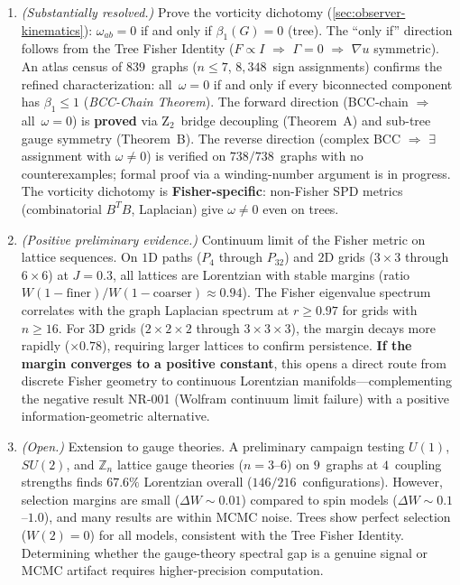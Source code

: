 \documentclass[11pt]{article}
\theoremstyle{definition}
\theoremstyle{remark}
\begin{document}
\begin{enumerate}
  \item \emph{(Substantially resolved.)} Prove the vorticity dichotomy
    (\cref{sec:observer-kinematics}): $\omega_{ab} = 0$ if and only
    if $\beta_1(G) = 0$ (tree). The ``only if'' direction follows from
    the Tree Fisher Identity ($F \propto I$ $\Rightarrow$ $\Gamma = 0$
    $\Rightarrow$ $\nabla u$ symmetric). An atlas census of $839$~graphs
    ($n \leq 7$, $8{,}348$~sign assignments) confirms the refined
    characterization: all~$\omega = 0$ if and only if every biconnected
    component has $\beta_1 \leq 1$ (\emph{BCC-Chain Theorem}).
    The forward direction (BCC-chain $\Rightarrow$ all~$\omega = 0$)
    is \textbf{proved} via Z$_2$~bridge decoupling
    (Theorem~A) and sub-tree gauge symmetry (Theorem~B).
    The reverse direction (complex BCC $\Rightarrow$ $\exists$
    assignment with $\omega \neq 0$) is verified on $738/738$~graphs
    with no counterexamples; formal proof via a winding-number argument
    is in progress. The vorticity dichotomy is
    \textbf{Fisher-specific}: non-Fisher SPD metrics (combinatorial $B^T B$,
    Laplacian) give $\omega \neq 0$ even on trees.

  \item \emph{(Positive preliminary evidence.)}
    Continuum limit of the Fisher metric on lattice sequences.
    On $1$D paths ($P_4$ through $P_{32}$) and $2$D grids ($3{\times}3$
    through $6{\times}6$) at $J = 0.3$, all lattices are Lorentzian
    with stable margins (ratio $W(1{-}\text{finer})/W(1{-}\text{coarser})
    \approx 0.94$). The Fisher eigenvalue spectrum correlates with the
    graph Laplacian spectrum at $r \geq 0.97$ for grids with $n \geq 16$.
    For $3$D grids ($2{\times}2{\times}2$ through $3{\times}3{\times}3$),
    the margin decays more rapidly ($\times 0.78$), requiring larger lattices
    to confirm persistence.
    \textbf{If the margin converges to a positive constant}, this opens a
    direct route from discrete Fisher geometry to continuous Lorentzian
    manifolds---complementing the negative result NR-001 (Wolfram continuum
    limit failure) with a positive information-geometric alternative.

  \item \emph{(Open.)} Extension to gauge theories.
    A preliminary campaign testing $U(1)$, $SU(2)$, and $\mathbb{Z}_n$
    lattice gauge theories ($n = 3$--$6$) on $9$~graphs at $4$~coupling
    strengths finds $67.6\%$ Lorentzian overall ($146/216$~configurations).
    However, selection margins are small ($\Delta W \sim 0.01$) compared to
    spin models ($\Delta W \sim 0.1$--$1.0$), and many results are
    within MCMC noise. Trees show perfect selection ($W(2) = 0$) for all
    models, consistent with the Tree Fisher Identity.
    Determining whether the gauge-theory spectral gap is a genuine signal
    or MCMC artifact requires higher-precision computation.
\end{enumerate}
\end{document}
